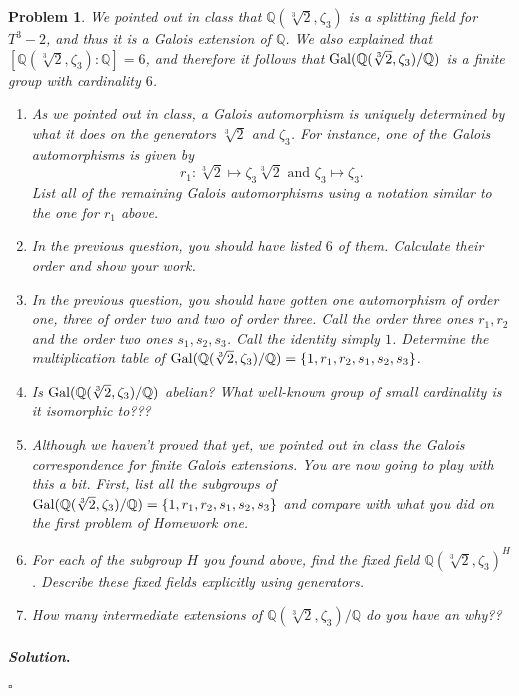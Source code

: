 \documentclass[reqno]{amsart}
\theoremstyle{plain}
\newtheorem{problem}{Problem}
\theoremstyle{definition}
\newenvironment{solution}{\paragraph{\emph{Solution}.}}{\hfill$\square$}
\begin{document}
\begin{problem}
We pointed out in class that $\mathbb{Q}(\sqrt[3]{2},\zeta_{3})$ is a splitting field for $T^{3} - 2$, and thus it is a Galois extension of $\mathbb{Q}$.  We also explained that $[\mathbb{Q}(\sqrt[3]{2},\zeta_{3}):\mathbb{Q}]=6$, and therefore it follows that ${\rm Gal}(\mathbb{Q}(\sqrt[3]{2},\zeta_{3})/\mathbb{Q})$ is a finite group with cardinality $6$.
\begin{enumerate}
\item As we pointed out in class, a Galois automorphism is uniquely determined by what it does on the generators $\sqrt[3]{2}$ and $\zeta_{3}$.  For instance, one of the Galois automorphisms is given by
$$r_{1}: \sqrt[3]{2} \mapsto \zeta_{3} \sqrt[3]{2} \text{ and } \zeta_{3} \mapsto \zeta_{3}. $$
List all of the remaining Galois automorphisms using a notation similar to the one for $r_{1}$ above.
\item In the previous question, you should have listed $6$ of them.  Calculate their order and show your work.
\item In the previous question, you should have gotten one automorphism of order one, three of order two and two of order three.  Call the order three ones $r_{1}, r_{2}$ and the order two ones $s_{1}, s_{2}, s_{3}$.  Call the identity simply $1$.  Determine the multiplication table of ${\rm Gal}(\mathbb{Q}(\sqrt[3]{2},\zeta_{3})/\mathbb{Q}) = \{1, r_{1}, r_{2}, s_{1}, s_{2}, s_{3} \}$.
\item Is ${\rm Gal}(\mathbb{Q}(\sqrt[3]{2},\zeta_{3})/\mathbb{Q})$ abelian?  What well-known group of small cardinality is it isomorphic to???
\item Although we haven't proved that yet, we pointed out in class the Galois correspondence for finite Galois extensions.  You are now going to play with this a bit.  First, list all the subgroups of ${\rm Gal}(\mathbb{Q}(\sqrt[3]{2},\zeta_{3})/\mathbb{Q}) = \{1, r_{1}, r_{2}, s_{1}, s_{2}, s_{3} \}$ and compare with what you did on the first problem of Homework one.
\item For each of the subgroup $H$ you found above, find the fixed field $\mathbb{Q}(\sqrt[3]{2},\zeta_{3})^{H}$.  Describe these fixed fields explicitly using generators.
\item How many intermediate extensions of $\mathbb{Q}(\sqrt[3]{2},\zeta_{3})/\mathbb{Q}$ do you have an why??
\end{enumerate}

\end{problem}
\begin{solution}

\end{solution}
\end{document}
